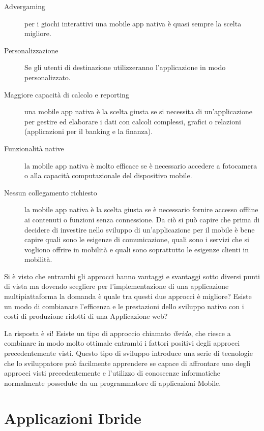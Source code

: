 \begin{description}
    \begin{description}
        \item[Advergaming] per i giochi interattivi una mobile app nativa è quasi sempre la scelta migliore.
        \item[Personalizzazione] Se gli utenti di destinazione utilizzeranno l'applicazione in modo personalizzato.
        \item[Maggiore capacità di calcolo  e reporting] una mobile app nativa è la scelta giusta se si necessita di un'applicazione per gestire ed elaborare i dati con calcoli complessi, grafici o relazioni (applicazioni per il banking e la finanza).
        \item[Funzionalità native] la mobile app nativa è molto efficace  se è necessario accedere a fotocamera o alla capacità computazionale del dispositivo mobile.
        \item[Nessun collegamento richiesto]la mobile app nativa è la scelta giusta se è necessario fornire accesso offline ai contenuti o funzioni senza connessione. Da ciò si può capire che prima di decidere di investire nello sviluppo di un'applicazione per il mobile è bene capire quali sono le esigenze di comunicazione, quali sono i servizi che si vogliono offrire in mobilità e quali sono soprattutto le esigenze clienti in mobilità.
    \end{description}
\end{description}

Si è visto che entrambi gli approcci hanno vantaggi e svantaggi sotto diversi punti di vista ma dovendo scegliere per l'implementazione di una applicazione multipiattaforma la domanda è quale tra questi due approcci è migliore? Esiste un modo di combianare l'efficenza e le prestazioni dello sviluppo nativo con i costi di produzione ridotti di una Applicazione web?

La risposta è si! Esiste un tipo di approccio chiamato \emph{ibrido}, che riesce a combinare in modo molto ottimale entrambi i fattori positivi degli approcci precedentemente visti. Questo tipo di sviluppo introduce una serie di tecnologie che lo sviluppatore può facilmente apprendere se capace di affrontare uno degli approcci visti precedentemente e l'utilizzo di conoscenze informatiche normalmente possedute da un programmatore di applicazioni Mobile.
\section{Applicazioni Ibride}
\label{section:hybridApp}

